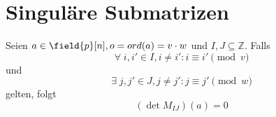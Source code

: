\section{Singuläre Submatrizen}

\begin{lemma} \label{lemma:equal-columns}
    Seien $a \in \field{p}[n], o = ord(a) = v\cdot w$ und $I,J \subseteq \mathbb{Z}$.
    Falls
    \begin{equation} \label{equation:all-equal}
        \forall \; i, i' \in I, i \neq i': i \equiv i' \pmod v
    \end{equation}
    und
    \begin{equation} \label{equation:two-equal}
        \exists \; j, j' \in J, j \neq j':  j \equiv j' \pmod w
    \end{equation}
    gelten, folgt
    \begin{equation*}
        (\det M_{IJ})(a) = 0
    \end{equation*}
\end{lemma}


